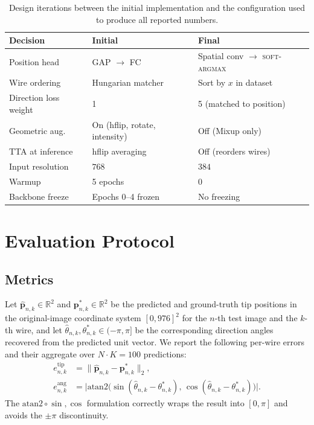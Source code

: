 \documentclass[conference,10pt,letterpaper]{IEEEtran}
\newcommand{\softargmax}{\textsc{soft-argmax}}
\begin{document}
\begin{table}[t]
\caption{Design iterations between the initial implementation and the
configuration used to produce all reported numbers.}
\label{tab:iteration}
\centering
\renewcommand{\arraystretch}{1.15}
\footnotesize
\begin{tabular}{p{} p{} p{}}
\toprule
\textbf{Decision} & \textbf{Initial} & \textbf{Final}\\
\midrule
Position head            & GAP $\to$ FC
                         & Spatial conv $\to$ \softargmax\\
Wire ordering            & Hungarian matcher
                         & Sort by $x$ in dataset\\
Direction loss weight    & 1
                         & 5 (matched to position)\\
Geometric aug.           & On (hflip, rotate, intensity)
                         & Off (Mixup only)\\
TTA at inference         & hflip averaging
                         & Off (reorders wires)\\
Input resolution         & $768$
                         & $384$\\
Warmup                   & 5 epochs
                         & 0\\
Backbone freeze          & Epochs 0--4 frozen
                         & No freezing\\
\bottomrule
\end{tabular}
\end{table}

\section{Evaluation Protocol}
\label{sec:eval}

\subsection{Metrics}
Let $\hat{\mathbf{p}}_{n,k}\in\mathbb{R}^2$ and $\mathbf{p}^*_{n,k}\in\mathbb{R}^2$
be the predicted and ground-truth tip positions in the original-image
coordinate system $[0,976]^2$ for the $n$-th test image and the $k$-th
wire, and let $\hat\theta_{n,k},\theta^*_{n,k}\in(-\pi,\pi]$ be the
corresponding direction angles recovered from the predicted unit vector.
We report the following per-wire errors and their aggregate over
$N\!\cdot\!K{=}100$ predictions:
\begin{align}
\label{eq:tip-error}
  e^\text{tip}_{n,k}  &= \|\hat{\mathbf{p}}_{n,k} - \mathbf{p}^*_{n,k}\|_2,\\
\label{eq:ang-error}
  e^\text{ang}_{n,k}  &= \bigl|\mathrm{atan2}\bigl(\sin(\hat\theta_{n,k}-\theta^*_{n,k}),\,
                                                   \cos(\hat\theta_{n,k}-\theta^*_{n,k})\bigr)\bigr|.
\end{align}
The $\mathrm{atan2}{\circ}\sin{,}\cos$ formulation correctly wraps the
result into $[0,\pi]$ and avoids the $\pm\pi$ discontinuity.
\end{document}
